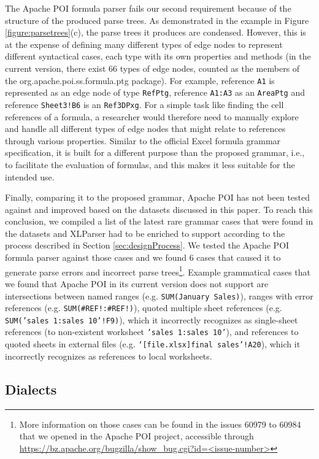 \documentclass[times]{smrauth}
\begin{document}
The Apache POI formula parser fails our second requirement because of the structure of the produced parse trees. As demonstrated in the example in Figure \ref{figure:parsetrees}(c), the parse trees it produces are condensed. However, this is at the expense of defining many different types of edge nodes to represent different syntactical cases, each type with its own properties and methods (in the current version, there exist 66 types of edge nodes, counted as the members of the org.apache.poi.ss.formula.ptg package). For example, reference \texttt{A1} is represented as an edge node of type \texttt{RefPtg}, reference \texttt{A1:A3} as an \texttt{AreaPtg} and reference \texttt{Sheet3!B6} is an \texttt{Ref3DPxg}. For a simple task like finding the cell references of a formula, a researcher would therefore need to manually explore and handle all different types of edge nodes that might relate to references through various properties. Similar to the official Excel formula grammar specification, it is built for a different purpose than the proposed grammar, i.e., to facilitate the evaluation of formulas, and this makes it less suitable for the intended use.

Finally, comparing it to the proposed grammar, Apache POI has not been tested against and improved based on the datasets discussed in this paper. To reach this conclusion, we compiled a list of the latest rare grammar cases that were found in the datasets and XLParser had to be enriched to support according to the process described in Section \ref{sec:designProcess}. We tested the Apache POI formula parser against those cases and we found 6 cases that caused it to generate parse errors and incorrect parse trees\footnote{More information on those cases can be found in the issues 60979 to 60984 that we opened in the Apache POI project, accessible through  \url{https://bz.apache.org/bugzilla/show_bug.cgi?id=<issue-number>}}. Example grammatical cases that we found that Apache POI in its current version does not support are intersections between named ranges (e.g.  \texttt{SUM(January Sales)}), ranges with error references (e.g. \texttt{SUM(#REF!:#REF!)}), quoted multiple sheet references (e.g. \texttt{SUM('sales 1:sales 10'!F9)}), which it incorrectly recognizes as single-sheet references (to non-existent worksheet \texttt{'sales 1:sales 10'}), and references to quoted sheets in external files (e.g. \texttt{‘[file.xlsx]final sales’!A20}), which it incorrectly recognizes as references to local worksheets.

\subsection{Dialects}
\end{document}
